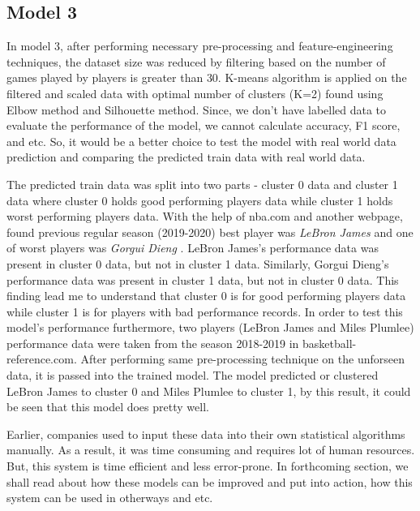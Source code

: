 \documentclass[format=sigconf]{acmart}
\begin{document}
\subsection{Model 3}
In model 3, after performing necessary pre-processing and feature-engineering techniques, the dataset size was reduced by filtering 
based on the number of games played by players is greater than 30. K-means algorithm is applied on the filtered and scaled data with
optimal number of clusters (K=2) found using Elbow method and Silhouette method. Since, we don't have labelled data to evaluate the 
performance of the model, we cannot calculate accuracy, F1 score, and etc. So, it would be a better choice to test the model with
real world data prediction and comparing the predicted train data with real world data. 

The predicted train data was split into two parts - cluster 0 data and cluster 1 data where cluster 0 holds good performing players
data while cluster 1 holds worst performing players data. With the help of nba.com and another webpage, found previous regular 
season (2019-2020) best player was \textit{LeBron James} \cite{bestplayer} and one of worst players was \textit{Gorgui Dieng} \cite{worstplayer}.
LeBron James's performance data was present in cluster 0 data, but not in cluster 1 data. Similarly, Gorgui Dieng's performance
data was present in cluster 1 data, but not in cluster 0 data. This finding lead me to understand that cluster 0 is for good 
performing players data while cluster 1 is for players with bad performance records. In order to test this model's performance
furthermore, two players (LeBron James and Miles Plumlee) performance data were taken from the season 2018-2019 in basketball-reference.com.
After performing same pre-processing technique on the unforseen data, it is passed into the trained model. The model predicted or 
clustered LeBron James \cite{bestplayer2} to cluster 0 and Miles Plumlee \cite{worstplayer2} to cluster 1, by this result, 
it could be seen that this model does pretty well.

Earlier, companies used to input these data into their own statistical algorithms manually. As a result, it was time consuming and 
requires lot of human resources. But, this system is time efficient and less error-prone. In forthcoming section, we shall read 
about how these models can be improved and put into action, how this system can be used in otherways and etc. 
\end{document}

